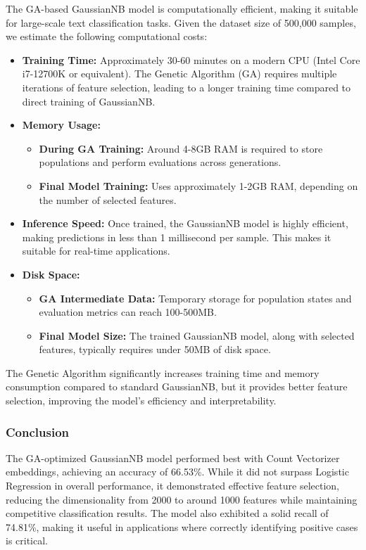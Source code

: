 The GA-based GaussianNB model is computationally efficient, making it suitable for large-scale text classification tasks. Given the dataset size of 500,000 samples, we estimate the following computational costs:

\begin{itemize}
    \item \textbf{Training Time:} Approximately 30-60 minutes on a modern CPU (Intel Core i7-12700K or equivalent). The Genetic Algorithm (GA) requires multiple iterations of feature selection, leading to a longer training time compared to direct training of GaussianNB.
    \item \textbf{Memory Usage:} 
    \begin{itemize}
        \item \textbf{During GA Training:} Around 4-8GB RAM is required to store populations and perform evaluations across generations.
        \item \textbf{Final Model Training:} Uses approximately 1-2GB RAM, depending on the number of selected features.
    \end{itemize}
    \item \textbf{Inference Speed:} Once trained, the GaussianNB model is highly efficient, making predictions in less than 1 millisecond per sample. This makes it suitable for real-time applications.
    \item \textbf{Disk Space:} 
    \begin{itemize}
        \item \textbf{GA Intermediate Data:} Temporary storage for population states and evaluation metrics can reach 100-500MB.
        \item \textbf{Final Model Size:} The trained GaussianNB model, along with selected features, typically requires under 50MB of disk space.
    \end{itemize}
\end{itemize}

The Genetic Algorithm significantly increases training time and memory consumption compared to standard GaussianNB, but it provides better feature selection, improving the model’s efficiency and interpretability.

\subsubsection{Conclusion}

The GA-optimized GaussianNB model performed best with Count Vectorizer embeddings, achieving an accuracy of 66.53\%. While it did not surpass Logistic Regression in overall performance, it demonstrated effective feature selection, reducing the dimensionality from 2000 to around 1000 features while maintaining competitive classification results. The model also exhibited a solid recall of 74.81\%, making it useful in applications where correctly identifying positive cases is critical.

